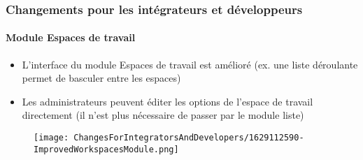 %

\begin{frame}[fragile]
	\frametitle{Changements pour les intégrateurs et développeurs}
	\framesubtitle{Module Espaces de travail}


	\begin{itemize}
		\item L'interface du module Espaces de travail est amélioré\newline
			\small(ex. une liste déroulante permet de basculer entre les espaces)\normalsize
		\item Les administrateurs peuvent éditer les options de l'espace de travail directement\newline
			\small(il n'est plus nécessaire de passer par le module liste)\normalsize
	\end{itemize}

	\begin{figure}
		\texttt{[image: ChangesForIntegratorsAndDevelopers/1629112590-ImprovedWorkspacesModule.png]}
	\end{figure}

\end{frame}

